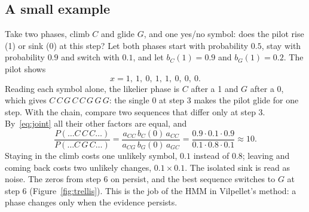\subsection{A small example}\label{sec:toy}

Take two phases, climb $C$ and glide $G$, and one yes/no symbol: does the pilot rise (1) or sink
(0) at this step? Let both phases start with probability $0.5$, stay with probability $0.9$ and
switch with $0.1$, and let $b_C(1)=0.9$ and $b_G(1)=0.2$. The pilot shows
\[
  x = 1,\ 1,\ 0,\ 1,\ 1,\ 0,\ 0,\ 0 .
\]
Reading each symbol alone, the likelier phase is $C$ after a 1 and $G$ after a 0, which gives
$C\,C\,G\,C\,C\,G\,G\,G$: the single 0 at step 3 makes the pilot glide for one step. With the
chain, compare two sequences that differ only at step 3. By~\eqref{eq:joint} all their other
factors are equal, and
\[
  \frac{P(\dots C\,C\,C\dots)}{P(\dots C\,G\,C\dots)}
  = \frac{a_{CC}\,b_C(0)\,a_{CC}}{a_{CG}\,b_G(0)\,a_{GC}}
  = \frac{0.9\cdot0.1\cdot0.9}{0.1\cdot0.8\cdot0.1}\approx10 .
\]
Staying in the climb costs one unlikely symbol, $0.1$ instead of $0.8$; leaving and coming back
costs two unlikely changes, $0.1\times0.1$. The isolated sink is read as noise. The zeros from
step 6 on persist, and the best sequence switches to $G$ at step 6
(Figure~\ref{fig:trellis}). This is the job of the HMM in Vilpellet's method: a phase changes only
when the evidence persists.


